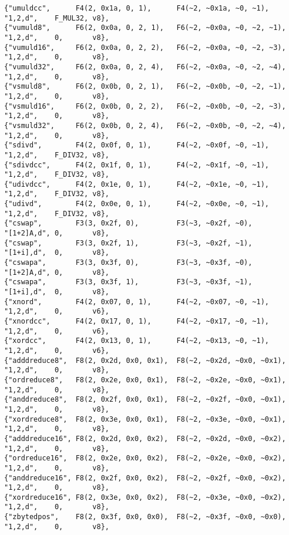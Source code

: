 {\begin{verbatim}
{"umuldcc",      F4(2, 0x1a, 0, 1),      F4(~2, ~0x1a, ~0, ~1),        "1,2,d",    F_MUL32, v8},
{"vumuld8",      F6(2, 0x0a, 0, 2, 1),   F6(~2, ~0x0a, ~0, ~2, ~1),    "1,2,d",    0,       v8},
{"vumuld16",     F6(2, 0x0a, 0, 2, 2),   F6(~2, ~0x0a, ~0, ~2, ~3),    "1,2,d",    0,       v8},
{"vumuld32",     F6(2, 0x0a, 0, 2, 4),   F6(~2, ~0x0a, ~0, ~2, ~4),    "1,2,d",    0,       v8},
{"vsmuld8",      F6(2, 0x0b, 0, 2, 1),   F6(~2, ~0x0b, ~0, ~2, ~1),    "1,2,d",    0,       v8},
{"vsmuld16",     F6(2, 0x0b, 0, 2, 2),   F6(~2, ~0x0b, ~0, ~2, ~3),    "1,2,d",    0,       v8},
{"vsmuld32",     F6(2, 0x0b, 0, 2, 4),   F6(~2, ~0x0b, ~0, ~2, ~4),    "1,2,d",    0,       v8},
{"sdivd",        F4(2, 0x0f, 0, 1),      F4(~2, ~0x0f, ~0, ~1),        "1,2,d",    F_DIV32, v8},
{"sdivdcc",      F4(2, 0x1f, 0, 1),      F4(~2, ~0x1f, ~0, ~1),        "1,2,d",    F_DIV32, v8},
{"udivdcc",      F4(2, 0x1e, 0, 1),      F4(~2, ~0x1e, ~0, ~1),        "1,2,d",    F_DIV32, v8},
{"udivd",        F4(2, 0x0e, 0, 1),      F4(~2, ~0x0e, ~0, ~1),        "1,2,d",    F_DIV32, v8},
{"cswap",        F3(3, 0x2f, 0),         F3(~3, ~0x2f, ~0),            "[1+2]A,d", 0,       v8},
{"cswap",        F3(3, 0x2f, 1),         F3(~3, ~0x2f, ~1),            "[1+i],d",  0,       v8},
{"cswapa",       F3(3, 0x3f, 0),         F3(~3, ~0x3f, ~0),            "[1+2]A,d", 0,       v8},
{"cswapa",       F3(3, 0x3f, 1),         F3(~3, ~0x3f, ~1),            "[1+i],d",  0,       v8},
{"xnord",        F4(2, 0x07, 0, 1),      F4(~2, ~0x07, ~0, ~1),        "1,2,d",    0,       v6},
{"xnordcc",      F4(2, 0x17, 0, 1),      F4(~2, ~0x17, ~0, ~1),        "1,2,d",    0,       v6},
{"xordcc",       F4(2, 0x13, 0, 1),      F4(~2, ~0x13, ~0, ~1),        "1,2,d",    0,       v6},
{"adddreduce8",  F8(2, 0x2d, 0x0, 0x1),  F8(~2, ~0x2d, ~0x0, ~0x1),    "1,2,d",    0,       v8},
{"ordreduce8",   F8(2, 0x2e, 0x0, 0x1),  F8(~2, ~0x2e, ~0x0, ~0x1),    "1,2,d",    0,       v8},
{"anddreduce8",  F8(2, 0x2f, 0x0, 0x1),  F8(~2, ~0x2f, ~0x0, ~0x1),    "1,2,d",    0,       v8},
{"xordreduce8",  F8(2, 0x3e, 0x0, 0x1),  F8(~2, ~0x3e, ~0x0, ~0x1),    "1,2,d",    0,       v8},
{"adddreduce16", F8(2, 0x2d, 0x0, 0x2),  F8(~2, ~0x2d, ~0x0, ~0x2),    "1,2,d",    0,       v8},
{"ordreduce16",  F8(2, 0x2e, 0x0, 0x2),  F8(~2, ~0x2e, ~0x0, ~0x2),    "1,2,d",    0,       v8},
{"anddreduce16", F8(2, 0x2f, 0x0, 0x2),  F8(~2, ~0x2f, ~0x0, ~0x2),    "1,2,d",    0,       v8},
{"xordreduce16", F8(2, 0x3e, 0x0, 0x2),  F8(~2, ~0x3e, ~0x0, ~0x2),    "1,2,d",    0,       v8},
{"zbytedpos",    F8(2, 0x3f, 0x0, 0x0),  F8(~2, ~0x3f, ~0x0, ~0x0),    "1,2,d",    0,       v8},

\end{verbatim}}
